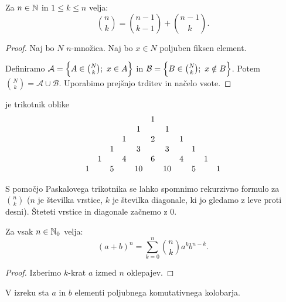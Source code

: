 \begin{trditev}
    Za $n \in \mathbb{N}$ in $1 \leq k \leq n$ velja:
    $$\binom{n}{k} = \binom{n-1}{k-1} + \binom{n-1}{k}.$$
\end{trditev}

\begin{proof}
    Naj bo $N$ $n$-množica. Naj bo $x \in N$ poljuben fiksen element. 
    
    Definiramo $\mathcal{A} = \left\{A \in \binom{N}{k}; \ x \in A\right\}$ in $\mathcal{B} = \left\{B \in \binom{N}{k}; \ x \notin B\right\}$. Potem $\binom{N}{k} = \mathcal{A} \cup \mathcal{B}$. Uporabimo prejšnjo trditev in načelo vsote.
\end{proof}

\begin{definicija} 
     je trikotnik oblike
    \[
    \setcounter{MaxMatrixCols}{20}   
    \begin{matrix}
        &&&&& 1 \\
        &&&& 1 && 1 \\
        &&& 1 && 2 && 1 \\
        && 1 && 3 && 3 && 1 \\
        & 1 && 4 && 6 && 4 && 1 \\
        1 && 5 && 10 && 10 && 5 && 1 

    \end{matrix}
    \]
\end{definicija}

\begin{opomba}
    S pomočjo Paskalovega trikotnika se lahko spomnimo rekurzivno formulo za $\binom{n}{k}$ ($n$ je številka vrstice, $k$ je številka diagonale, ki jo gledamo z leve proti desni). Šteteti vrstice in diagonale začnemo z $0$.
\end{opomba}

\begin{izrek}
    Za vsak $n \in \mathbb{N}_0$ velja:
    $$(a+b)^n = \sum_{k=0}^{n} \binom{n}{k}a^kb^{n-k}.$$
\end{izrek}

\begin{proof}
    Izberimo $k$-krat $a$ izmed $n$ oklepajev.
\end{proof}

\begin{opomba}
    V izreku sta $a$ in $b$ elementi poljubnega komutativnega kolobarja.
\end{opomba}

\newpage
